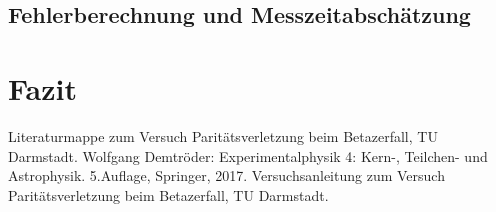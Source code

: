 \documentclass[twoside,colorback,accentcolor=tud4c,11pt]{tudreport}
\begin{document}
\section{Fehlerberechnung und Messzeitabschätzung}

\chapter{Fazit}




		

\renewcommand{\bibname}{Literaturverzeichnis}
\begin{thebibliography}{Bak89}
 Literaturmappe zum Versuch Paritätsverletzung beim Betazerfall, TU Darmstadt.
 Wolfgang Demtröder: Experimentalphysik 4: Kern-, Teilchen- und Astrophysik. 5.Auflage, Springer, 2017.
 Versuchsanleitung zum Versuch Paritätsverletzung beim Betazerfall, TU Darmstadt.




\end{thebibliography} 	
\end{document}
